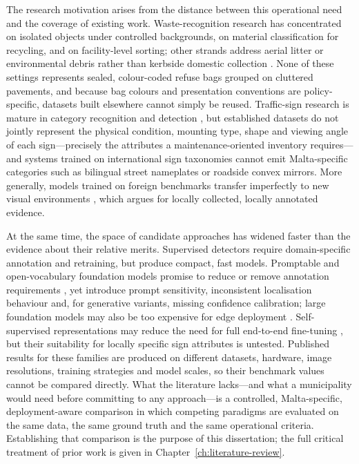 The research motivation arises from the distance between this operational need and the coverage of existing work. Waste-recognition research has concentrated on isolated objects under controlled backgrounds, on material classification for recycling, and on facility-level sorting; other strands address aerial litter or environmental debris rather than kerbside domestic collection \citep{yang2016trashnet,proenca2020taco,bashkirova2022zerowaste,abdallah2020artificial}. None of these settings represents sealed, colour-coded refuse bags grouped on cluttered pavements, and because bag colours and presentation conventions are policy-specific, datasets built elsewhere cannot simply be reused. Traffic-sign research is mature in category recognition and detection \citep{stallkamp2012man,ertler2020mapillary}, but established datasets do not jointly represent the physical condition, mounting type, shape and viewing angle of each sign---precisely the attributes a maintenance-oriented inventory requires---and systems trained on international sign taxonomies cannot emit Malta-specific categories such as bilingual street nameplates or roadside convex mirrors. More generally, models trained on foreign benchmarks transfer imperfectly to new visual environments \citep{torralba2011unbiased}, which argues for locally collected, locally annotated evidence.

At the same time, the space of candidate approaches has widened faster than the evidence about their relative merits. Supervised detectors require domain-specific annotation and retraining, but produce compact, fast models. Promptable and open-vocabulary foundation models promise to reduce or remove annotation requirements \citep{kirillov2023segment,meta2025sam3}, yet introduce prompt sensitivity, inconsistent localisation behaviour and, for generative variants, missing confidence calibration; large foundation models may also be too expensive for edge deployment \citep{chen2019deep}. Self-supervised representations may reduce the need for full end-to-end fine-tuning \citep{simeoni2025dinov3,hu2022lora}, but their suitability for locally specific sign attributes is untested. Published results for these families are produced on different datasets, hardware, image resolutions, training strategies and model scales, so their benchmark values cannot be compared directly. What the literature lacks---and what a municipality would need before committing to any approach---is a controlled, Malta-specific, deployment-aware comparison in which competing paradigms are evaluated on the same data, the same ground truth and the same operational criteria. Establishing that comparison is the purpose of this dissertation; the full critical treatment of prior work is given in Chapter~\ref{ch:literature-review}.

